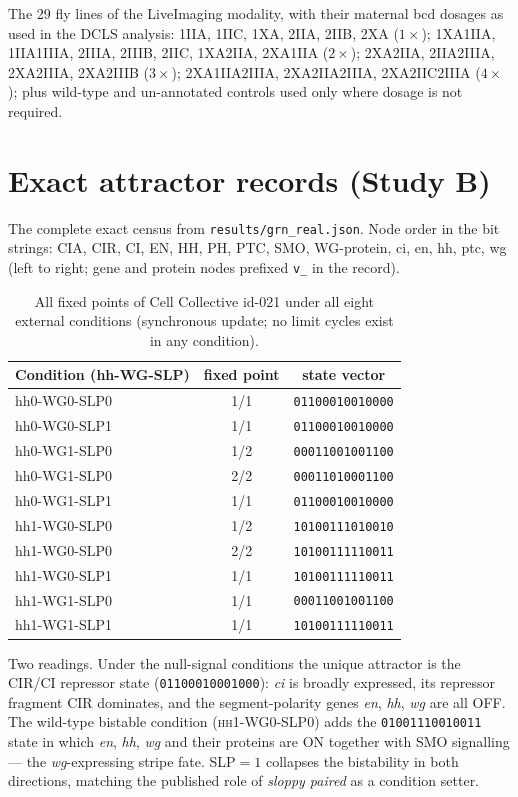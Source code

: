 The 29 fly lines of the LiveImaging modality, with their maternal bcd dosages
as used in the DCLS analysis: 1IIA, 1IIC, 1XA, 2IIA, 2IIB, 2XA ($1\times$);
1XA1IIA, 1IIA1IIIA, 2IIIA, 2IIIB, 2IIC, 1XA2IIA, 2XA1IIA ($2\times$);
2XA2IIA, 2IIA2IIIA, 2XA2IIIA, 2XA2IIIB ($3\times$); 2XA1IIA2IIIA,
2XA2IIA2IIIA, 2XA2IIC2IIIA ($4\times$); plus wild-type and un-annotated
controls used only where dosage is not required.

\section{Exact attractor records (Study B)}
\label{app:attractors}

The complete exact census from \texttt{results/grn\_real.json}. Node order in
the bit strings: CIA, CIR, CI, EN, HH, PH, PTC, SMO, WG-protein, ci, en, hh,
ptc, wg (left to right; gene and protein nodes prefixed \texttt{v\_} in the
record).

\begin{table}[!htbp]
\centering
\caption{All fixed points of Cell Collective id-021 under all eight external
conditions (synchronous update; no limit cycles exist in any condition).}
\label{tab:allattractors}
\begin{tabular}{lcc}
\toprule
Condition (hh-WG-SLP) & fixed point & state vector \\
\midrule
hh0-WG0-SLP0 & 1/1 & \texttt{01100010010000} \\
hh0-WG0-SLP1 & 1/1 & \texttt{01100010010000} \\
hh0-WG1-SLP0 & 1/2 & \texttt{00011001001100} \\
hh0-WG1-SLP0 & 2/2 & \texttt{00011010001100} \\
hh0-WG1-SLP1 & 1/1 & \texttt{01100010010000} \\
hh1-WG0-SLP0 & 1/2 & \texttt{10100111010010} \\
hh1-WG0-SLP0 & 2/2 & \texttt{10100111110011} \\
hh1-WG0-SLP1 & 1/1 & \texttt{10100111110011} \\
hh1-WG1-SLP0 & 1/1 & \texttt{00011001001100} \\
hh1-WG1-SLP1 & 1/1 & \texttt{10100111110011} \\
\bottomrule
\end{tabular}
\end{table}

Two readings. Under the null-signal conditions the unique attractor is the
CIR/CI repressor state (\texttt{01100010001000}): \emph{ci} is broadly
expressed, its repressor fragment CIR dominates, and the segment-polarity
genes \emph{en}, \emph{hh}, \emph{wg} are all OFF. The wild-type bistable
condition (\textsc{hh}1-\textsc{WG}0-\textsc{SLP}0) adds the
\texttt{01001110010011} state in which \emph{en}, \emph{hh}, \emph{wg} and
their proteins are ON together with SMO signalling --- the
\emph{wg}-expressing stripe fate. \textsc{SLP}$=1$ collapses the bistability
in both directions, matching the published role of \emph{sloppy paired} as a
condition setter.

